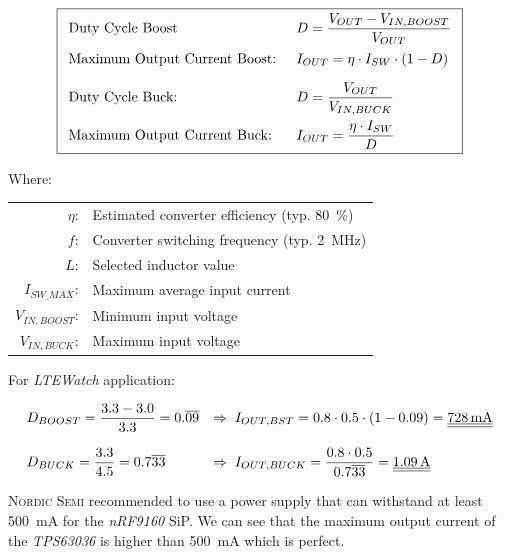 \documentclass[report.tex]{subfiles}
\begin{document}
\begin{enumerate}
\begin{equation}
\label{eq:TPS63036_ilim}
\boxed{\begin{array}{l l}
\text{Duty Cycle Boost} & D = \dfrac{V_{OUT}-V_{IN,BOOST}}{V_{OUT}}\\[10pt]
\text{Maximum Output Current Boost: } & I_{OUT} = \eta \cdot I_{SW} \cdot (1-D)\\[10pt]
\text{Duty Cycle Buck: } & D = \dfrac{V_{OUT}}{V_{IN,BUCK}}\\[10pt]
\text{Maximum Output Current Buck: } & I_{OUT} = \dfrac{\eta \cdot I_{SW}}{D}\\
\end{array}}
\end{equation}

Where:

\begin{center}
\begin{tabular}{r l}
$\eta$: & Estimated converter efficiency (typ. \SI{80}{\percent})\\
$f$: & Converter switching frequency (typ. \SI{2}{\mega\hertz})\\
$L$: & Selected inductor value\\
$I_{SW\_MAX}$: & Maximum average input current\\
$V_{IN,BOOST}$: & Minimum input voltage \\
$V_{IN,BUCK}$: & Maximum input voltage\\[10pt]
\end{tabular}
\end{center}

For \textit{LTEWatch} application:

$$
\begin{array}{l l}
D_{BOOST} = \dfrac{3.3 - 3.0}{3.3} = 0.\overline{09} & \Rightarrow \; I_{OUT,BST} = 0.8 \cdot 0.5 \cdot (1-0.09) = \underline{\underline{\SI{728}{\milli\ampere}}}\\[15pt]
 D_{BUCK} = \dfrac{3.3}{4.5} = 0.7\overline{33} & \Rightarrow \; I_{OUT,BUCK} = \dfrac{0.8 \cdot 0.5}{0.7\overline{33}} = \underline{\underline{\SI{1.09}{\ampere}}}
\end{array}
$$

\textsc{Nordic Semi} recommended to use a power supply that can withstand at least \SI{500}{\milli\ampere} for the \textit{nRF9160} SiP. We can see that the maximum output current of the \textit{TPS63036} is higher than \SI{500}{\milli\ampere} which is perfect.


\end{enumerate}
\end{document}
